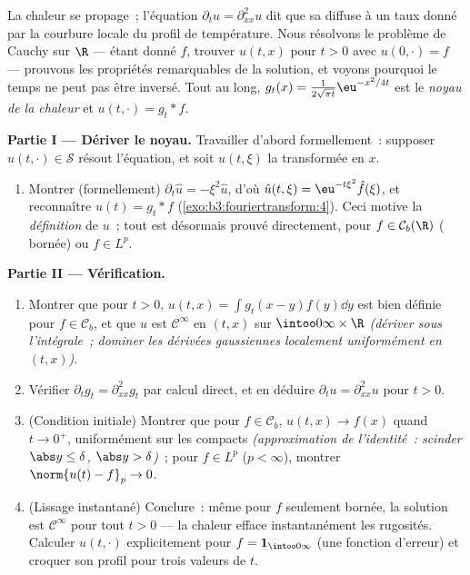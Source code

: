 \begin{problem}[{Problème du week-end --- $\partial_tu =
\partial^2_{xx}u$, résolue de bout en bout}]
\label{pb:b3:fouriertransform:1}
La chaleur se propage~; l'équation $\partial_tu =
\partial_{xx}^2u$ dit que sa  diffuse à un taux donné
par la courbure locale du profil de température. Nous
résolvons le problème de Cauchy sur $\R$ --- étant donné $f$,
trouver $u(t, x)$ pour $t > 0$ avec $u(0, \cdot) = f$ ---
prouvons les propriétés remarquables de la solution, et voyons
pourquoi le temps ne peut pas être inversé. Tout au long,
$g_t(x) = \frac1{2\sqrt{\pi t}}\eu^{-x^2/4t}$ est le
\emph{noyau de la chaleur} et
$u(t, \cdot) = g_t * f$.

\medskip
\noindent\textbf{Partie I --- Dériver le noyau.} Travailler
d'abord formellement~: supposer $u(t, \cdot) \in \mathcal S$
résout l'équation, et soit $\hat u(t, \xi)$ la transformée en
$x$.
\begin{enumerate}
  \item Montrer (formellement) $\partial_t\hat u =
        -\xi^2\hat u$, d'où $\hat u(t,\xi) =
        \eu^{-t\xi^2}\hat f(\xi)$, et reconnaître $u(t) =
        g_t * f$ (\cref{exo:b3:fouriertransform:4}). Ceci
        motive la \emph{définition} de $u$~; tout est
        désormais prouvé directement, pour $f \in \mathcal
        C_b(\R)$ ( bornée) ou $f \in L^p$.
\end{enumerate}

\medskip
\noindent\textbf{Partie II --- Vérification.}
\begin{enumerate}[resume]
  \item Montrer que pour $t > 0$, $u(t, x) = \int
        g_t(x-y)f(y)\dd y$ est bien définie pour $f \in
        \mathcal C_b$, et que $u$ est $\mathcal C^\infty$ en
        $(t, x)$ sur $\intoo0\infty\times\R$
        \emph{(dériver sous l'intégrale~; dominer les
        dérivées gaussiennes localement uniformément en
        $(t,x)$)}.
  \item Vérifier $\partial_tg_t = \partial^2_{xx}g_t$ par
        calcul direct, et en déduire $\partial_tu =
        \partial^2_{xx}u$ pour $t > 0$.
  \item (Condition initiale) Montrer que pour $f \in \mathcal
        C_b$, $u(t, x) \to f(x)$ quand $t \to 0^+$,
        uniformément sur les compacts \emph{(approximation de
        l'identité~: scinder $\abs y \leq \delta$, $\abs y >
        \delta$)}~; pour $f \in L^p$ ($p < \infty$), montrer
        $\norm{u(t) - f}_p \to 0$.
  \item (Lissage instantané) Conclure~: même pour $f$
        seulement  bornée, la solution est $\mathcal
        C^\infty$ pour tout $t > 0$ --- la chaleur efface
        instantanément les rugosités. Calculer $u(t, \cdot)$
        explicitement pour $f = \mathbf 1_{\intoo0\infty}$
        (une fonction d'erreur) et croquer son profil pour
        trois valeurs de $t$.
\end{enumerate}


\end{problem}
